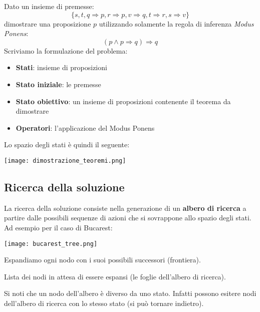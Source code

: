 \begin{example}
	Dato un insieme di premesse:
	\begin{equation}
		\{s, t, q \Rightarrow p, r \Rightarrow p, v \Rightarrow q, t \Rightarrow r, s \Rightarrow v\}
	\end{equation}
	dimostrare una proposizione $p$ utilizzando solamente la regola di inferenza \emph{Modus Ponens}:
	\begin{equation*}
		(p \wedge p\Rightarrow q) \Rightarrow q
	\end{equation*}
	Scriviamo la formulazione del problema:
	\begin{itemize}
		\item \textbf{Stati}: insieme di proposizioni
		\item \textbf{Stato iniziale}: le premesse
		\item \textbf{Stato obiettivo}: un insieme di proposizioni contenente il teorema da dimostrare
		\item \textbf{Operatori}: l'applicazione del Modus Ponens
	\end{itemize}
	Lo spazio degli stati è quindi il seguente:
	\begin{center}
		\texttt{[image: dimostrazione\_teoremi.png]}
	\end{center}
\end{example}

\subsection{Ricerca della soluzione}
La ricerca della soluzione consiste nella generazione di un \textbf{albero di ricerca} a partire dalle possibili sequenze di azioni che si sovrappone allo spazio degli stati.\\
Ad esempio per il caso di Bucarest:
\begin{center}
	\texttt{[image: bucarest\_tree.png]}
\end{center}
Espandiamo ogni nodo con i suoi possibili successori (frontiera).
\begin{definition}[Frontiera]
	Lista dei nodi in attesa di essere espansi (le foglie dell'albero di ricerca).
\end{definition}
\begin{observation}
	Si noti che un nodo dell'albero è diverso da uno stato. Infatti possono esitere nodi dell'albero di ricerca con lo stesso stato (si può tornare indietro).
\end{observation}

